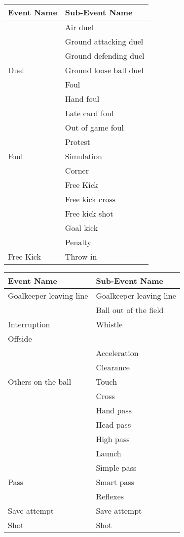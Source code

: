 \documentclass[]{book}
\begin{document}
\begin{wraptable}{l}{0pt}
\begin{tabular}{l|l}
\hline
Event Name & Sub-Event Name\\
\hline
 & Air duel\\
\cline{2-2}
 & Ground attacking duel\\
\cline{2-2}
 & Ground defending duel\\
\cline{2-2}
\multirow[t]{-4}{*}{\raggedright\arraybackslash Duel} & Ground loose ball duel\\
\cline{1-2}
 & Foul\\
\cline{2-2}
 & Hand foul\\
\cline{2-2}
 & Late card foul\\
\cline{2-2}
 & Out of game foul\\
\cline{2-2}
 & Protest\\
\cline{2-2}
\multirow[t]{-6}{*}{\raggedright\arraybackslash Foul} & Simulation\\
\cline{1-2}
 & Corner\\
\cline{2-2}
 & Free Kick\\
\cline{2-2}
 & Free kick cross\\
\cline{2-2}
 & Free kick shot\\
\cline{2-2}
 & Goal kick\\
\cline{2-2}
 & Penalty\\
\cline{2-2}
\multirow[t]{-7}{*}{\raggedright\arraybackslash Free Kick} & Throw in\\
\hline
\end{tabular}\end{wraptable}

\begin{tabular}{l|l}
\hline
Event Name & Sub-Event Name\\
\hline
Goalkeeper leaving line & Goalkeeper leaving line\\
\cline{1-2}
 & Ball out of the field\\
\cline{2-2}
\multirow[t]{-2}{*}{\raggedright\arraybackslash Interruption} & Whistle\\
\cline{1-2}
Offside & \\
\cline{1-2}
 & Acceleration\\
\cline{2-2}
 & Clearance\\
\cline{2-2}
\multirow[t]{-3}{*}{\raggedright\arraybackslash Others on the ball} & Touch\\
\cline{1-2}
 & Cross\\
\cline{2-2}
 & Hand pass\\
\cline{2-2}
 & Head pass\\
\cline{2-2}
 & High pass\\
\cline{2-2}
 & Launch\\
\cline{2-2}
 & Simple pass\\
\cline{2-2}
\multirow[t]{-7}{*}{\raggedright\arraybackslash Pass} & Smart pass\\
\cline{1-2}
 & Reflexes\\
\cline{2-2}
\multirow[t]{-2}{*}{\raggedright\arraybackslash Save attempt} & Save attempt\\
\cline{1-2}
Shot & Shot\\
\hline
\end{tabular}
\end{document}

